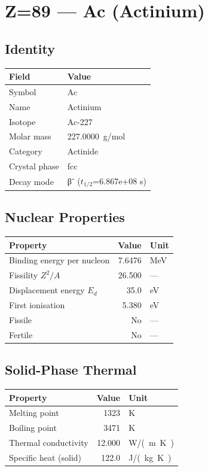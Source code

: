 \documentclass[11pt,a4paper]{article}
\begin{document}
\newpage

\section{Z=89 --- Ac (Actinium)}
\label{sec:Z89}

\subsection{Identity}
\begin{tabular}{ll}
  \toprule
  Field & Value \\
  \midrule
  Symbol & Ac \\
  Name & Actinium \\
  Isotope & Ac-227 \\
  Molar mass & \SI{227.0000}{g/mol} \\
  Category & Actinide \\
  Crystal phase & fcc \\
  Decay mode & β⁻ ($t_{1/2}$=6.867e+08 s) \\
  \bottomrule
\end{tabular}

\subsection{Nuclear Properties}
\begin{tabular}{lrl}
  \toprule
  Property & Value & Unit \\
  \midrule
  Binding energy per nucleon & 7.6476 & \si{MeV} \\
  Fissility $Z^2/A$ & 26.500 & --- \\
  Displacement energy $E_d$ & 35.0 & \si{eV} \\
  First ionisation & 5.380 & \si{eV} \\
  Fissile & No & --- \\
  Fertile & No & --- \\
  \bottomrule
\end{tabular}

\subsection{Solid-Phase Thermal}
\begin{tabular}{lrl}
  \toprule
  Property & Value & Unit \\
  \midrule
  Melting point & 1323 & \si{K} \\
  Boiling point & 3471 & \si{K} \\
  Thermal conductivity & 12.000 & \si{W/(m.K)} \\
  Specific heat (solid) & 122.0 & \si{J/(kg.K)} \\
  \bottomrule
\end{tabular}
\end{document}
